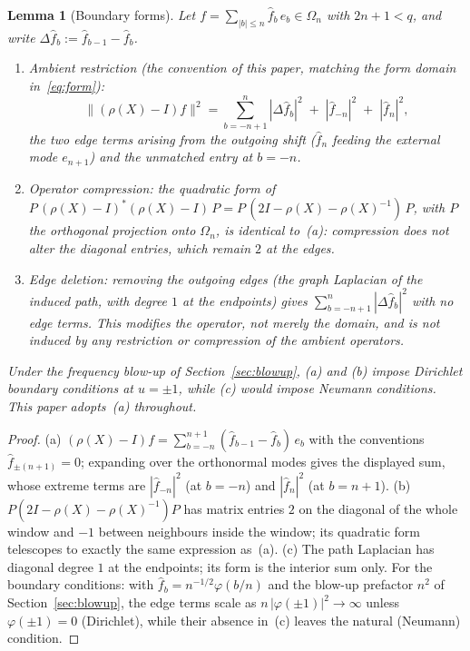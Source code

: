\documentclass[11pt,a4paper]{article}
\theoremstyle{plain}
\newtheorem{lemma}[theorem]{Lemma}
\theoremstyle{definition}
\theoremstyle{remark}
\begin{document}
    \begin{lemma}[Boundary forms]
      \label{lem:boundary}
      Let $f = \sum_{|b| \le n} \hat f_b\, e_b \in \Omega_n$ with $2n + 1 < q$, and write
      $\Delta \hat f_b := \hat f_{b-1} - \hat f_b$.
      \begin{enumerate}
        \item[\textup{(a)}] \emph{Ambient restriction} (the convention of this paper, matching the form
        domain in~\eqref{eq:form}):
        \[
          \|(\rho(X) - I) f\|^2
          = \sum_{b=-n+1}^{n} |\Delta \hat f_b|^2 \;+\; |\hat f_{-n}|^2 \;+\; |\hat f_{n}|^2 ,
        \]
        the two edge terms arising from the outgoing shift ($\hat f_n$ feeding the external mode
        $e_{n+1}$) and the unmatched entry at $b = -n$.
        \item[\textup{(b)}] \emph{Operator compression}: the quadratic form of
        $P\,(\rho(X) - I)^*(\rho(X) - I)\,P = P\,(2I - \rho(X) - \rho(X)^{-1})\,P$, with $P$ the
        orthogonal projection onto $\Omega_n$, is identical to~\textup{(a)}: compression does not alter
        the diagonal entries, which remain $2$ at the edges.
        \item[\textup{(c)}] \emph{Edge deletion}: removing the outgoing edges (the graph Laplacian of
        the induced path, with degree $1$ at the endpoints) gives
        $\sum_{b=-n+1}^{n} |\Delta \hat f_b|^2$ with no edge terms.
        This modifies the operator, not merely the domain, and is not induced by any restriction or
        compression of the ambient operators.
      \end{enumerate}
      Under the frequency blow-up of Section~\ref{sec:blowup}, \textup{(a)} and \textup{(b)} impose
      Dirichlet boundary conditions at $u = \pm 1$, while \textup{(c)} would impose Neumann conditions.
      This paper adopts~\textup{(a)} throughout.
    \end{lemma}

    \begin{proof}
      (a) $(\rho(X) - I) f = \sum_{b=-n}^{n+1} (\hat f_{b-1} - \hat f_b)\, e_b$ with the conventions
      $\hat f_{\pm(n+1)} = 0$; expanding over the orthonormal modes gives the displayed sum, whose
      extreme terms are $|\hat f_{-n}|^2$ (at $b = -n$) and $|\hat f_n|^2$ (at $b = n+1$).
      (b) $P(2I - \rho(X) - \rho(X)^{-1})P$ has matrix entries $2$ on the diagonal of the whole window
      and $-1$ between neighbours inside the window; its quadratic form telescopes to exactly the same
      expression as~(a).
      (c) The path Laplacian has diagonal degree $1$ at the endpoints; its form is the interior sum
      only.
      For the boundary conditions: with $\hat f_b = n^{-1/2}\varphi(b/n)$ and the blow-up prefactor
      $n^{2}$ of Section~\ref{sec:blowup}, the edge terms scale as $n\,|\varphi(\pm 1)|^2 \to \infty$
      unless $\varphi(\pm 1) = 0$ (Dirichlet), while their absence in~(c) leaves the natural (Neumann)
      condition.
    \end{proof}
\end{document}
